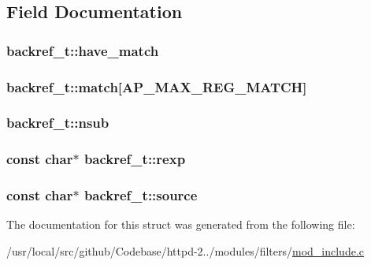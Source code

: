 \subsection{Field Documentation}
\subsubsection[{\texorpdfstring{have\+\_\+match}{have_match}}]{ backref\+\_\+t\+::have\+\_\+match}\hypertarget{structbackref__t_a762be7e19f4ae98ed3a90753df97850f}{}\label{structbackref__t_a762be7e19f4ae98ed3a90753df97850f}
\subsubsection[{\texorpdfstring{match}{match}}]{ backref\+\_\+t\+::match\mbox{[}{\bf A\+P\+\_\+\+M\+A\+X\+\_\+\+R\+E\+G\+\_\+\+M\+A\+T\+CH}\mbox{]}}\hypertarget{structbackref__t_abec48b8a852220839adaea23854bd24f}{}\label{structbackref__t_abec48b8a852220839adaea23854bd24f}
\subsubsection[{\texorpdfstring{nsub}{nsub}}]{ backref\+\_\+t\+::nsub}\hypertarget{structbackref__t_a9ec7565fa057adbae7cdced896e7051e}{}\label{structbackref__t_a9ec7565fa057adbae7cdced896e7051e}
\subsubsection[{\texorpdfstring{rexp}{rexp}}]{\setlength{\rightskip}{0pt plus 5cm}const char$\ast$ backref\+\_\+t\+::rexp}\hypertarget{structbackref__t_a9ac4604612d7a31e60a4ff6a66bfcbc4}{}\label{structbackref__t_a9ac4604612d7a31e60a4ff6a66bfcbc4}
\subsubsection[{\texorpdfstring{source}{source}}]{\setlength{\rightskip}{0pt plus 5cm}const char$\ast$ backref\+\_\+t\+::source}\hypertarget{structbackref__t_a387ecd9d4979b9bc806aa9ab1c77d324}{}\label{structbackref__t_a387ecd9d4979b9bc806aa9ab1c77d324}


The documentation for this struct was generated from the following file\+:\begin{DoxyCompactItemize}
\item 
/usr/local/src/github/\+Codebase/httpd-\/2../modules/filters/\hyperlink{mod__include_8c}{mod\+\_\+include.\+c}\end{DoxyCompactItemize}

